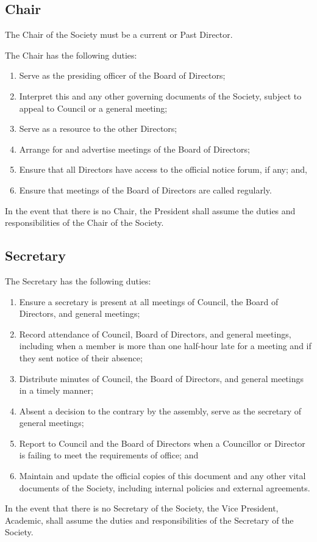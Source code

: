 \subsection{Chair}
The Chair of the Society must be a current or Past Director.

The Chair has the following duties:
\begin{enumerate}
    \item Serve as the presiding officer of the Board of Directors;
    \item Interpret this and any other governing documents of the Society,
        subject to appeal to Council or a general meeting;
    \item Serve as a resource to the other Directors;
    \item Arrange for and advertise meetings of the Board of Directors;
    \item Ensure that all Directors have access to the official notice
        forum, if any; and,
    \item Ensure that meetings of the Board of Directors are called regularly.
\end{enumerate}

In the event that there is no Chair, the President shall assume the duties and
responsibilities of the Chair of the Society. 

\subsection{Secretary}
The Secretary has the following duties:
\begin{enumerate}
    \item Ensure a secretary is present at all meetings of Council,
        the Board of Directors, and general meetings;
    \item Record attendance of Council, Board of Directors, and
        general meetings, including when a member is more than one half-hour
        late for a meeting and if they sent notice of their absence;
    \item Distribute minutes of Council, the Board of Directors, and 
        general meetings in a timely manner;
    \item Absent a decision to the contrary by the assembly, serve as the
        secretary of general meetings;
    \item Report to Council and the Board of Directors when a Councillor
        or Director is failing to meet the requirements of office; and
    \item Maintain and update the official copies of this document and any other
        vital documents of the Society, including internal policies and external
        agreements.
\end{enumerate}

In the event that there is no Secretary of the Society, the Vice President,
Academic, shall assume the duties and responsibilities of the Secretary of the
Society.


